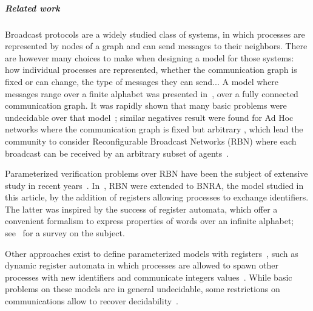 \subparagraph*{Related work} 
Broadcast protocols are a widely studied class of systems, in which processes are represented by nodes of a graph and can send messages to their neighbors. There are however many choices to make when designing a model for those systems: how individual processes are represented, whether the communication graph is fixed or can change, the type of messages they can send... 
A model where messages range over a finite alphabet was presented in~\cite{emerson1998model}, over a fully connected communication graph. It was rapidly shown that many basic problems were undecidable over that model~\cite{EsparzaFM1999verification}; similar negatives result were found for Ad Hoc networks where the communication graph is fixed but arbitrary \cite{DBLP:conf/concur/DelzannoSZ10}, which lead the community to consider Reconfigurable Broadcast Networks (RBN) where each broadcast can be received by an arbitrary subset of agents~\cite{DelzannoSZ2010Adhoc}.

Parameterized verification problems over RBN have been the subject of extensive study in recent years~\cite{DelzannoSTZ12, Balasubramanian18, BalasubramanianGW22, DBLP:journals/computing/ChiniMS22}. In~\cite{DelzannoST13}, RBN were extended to BNRA, the model studied in this article, by the addition of registers allowing processes to exchange identifiers. The latter was inspired by the success of register automata, which offer a convenient formalism to express properties of words over an infinite alphabet; see~\cite{Segoufin06} for a survey on the subject.

Other approaches exist to define parameterized models with registers~\cite{BolligRS21}, such as dynamic register automata in which processes are allowed to spawn other processes with new identifiers and communicate integers values~\cite{AbdullaAKR14}. While basic problems on these models are in general undecidable, some restrictions on communications allow to recover decidability~\cite{AbdullaAKR15, Rezine17}.

